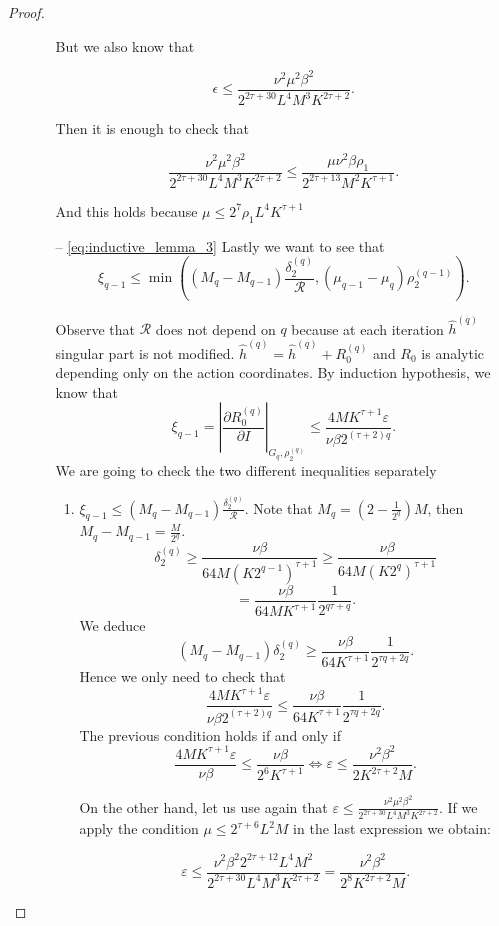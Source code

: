 \begin{proof}
\begin{enumerate}
\begin{itemize}
But we also know that

$$\epsilon \leq \frac{\nu^2 \mu^2 \beta^2}{2^{2\tau+30}L^4 M^3 K^{2\tau+2}}.$$

Then it is enough to check that

$$\frac{\nu^2 \mu^2 \beta^2}{2^{2\tau+30}L^4 M^3 K^{2\tau+2}}\leq \frac{\mu \nu^2 \beta \rho_1}{2^{2\tau+13} M^2 K^{\tau+1}}.$$

And this holds because $\mu \leq 2^7 \rho_1 L^4 K^{\tau+1}$

\item[--] \ref{eq:inductive_lemma_3} Lastly we want to see that
$$\xi_{q-1} \leq \min((M_q-M_{q-1})\frac{\delta_2^{(q)}}{\mathcal{R}},(\mu_{q-1}-\mu_{q})\rho_2^{(q-1)}).$$

Observe that $\mathcal{R}$ does not depend on $q$ because at each iteration $\hat{h}^{(q)}$ singular part is not modified. $\hat h^{(q)}= \hat h^{(q)} + R_0^{(q)}$ and $R_0$ is analytic depending only on the action coordinates.
By induction hypothesis, we know that
$$\xi_{q-1} = |\frac{\partial R_0^{(q)}}{\partial I}|_{G_q,\rho_2^{(q)}} \leq \frac{4MK^{\tau+1}\varepsilon}{\nu \beta 2^{(\tau+2)q}}.$$
We are going to check the \textcolor{black}{two} different inequalities separately
\begin{enumerate}
\item $\xi_{q-1} \leq (M_q-M_{q-1})\frac{\delta_2^{(q)}}{\mathcal{R}}$.
Note that $M_q =(2-\frac{1}{2^q})M$, then $M_q-M_{q-1} = \frac{M}{2^q}$.
$$\delta_2^{(q)} \geq \frac{\nu \beta}{64 M (K 2^{q-1})^{\tau+1}} \geq \frac{\nu\beta}{64 M (K 2^q)^{\tau+1}}$$
$$= \frac{\nu \beta}{64 M K^{\tau+1}}\frac{1}{2^{q\tau+q}}.$$
We deduce
$$(M_q-M_{q-1})\delta_2^{(q)} \geq \frac{\nu \beta}{64 K^{\tau+1}}\frac{1}{2^{\tau q + 2 q}}.$$
Hence we only need to check that
$$\frac{4MK^{\tau+1}\varepsilon}{\nu \beta 2^{(\tau+2)q}}\leq\frac{\nu \beta}{64 K^{\tau+1}}\frac{1}{2^{\tau q + 2 q}}.$$
The previous condition holds if and only if
$$\frac{4 M K^{\tau+1}\varepsilon}{\nu\beta} \leq \frac{\nu \beta}{2^6 K^{\tau+1}} \Leftrightarrow \varepsilon \leq \frac{\nu^2 \beta^2}{2 K^{2\tau+2}M}.$$

On the other hand, let us use again that $\varepsilon \leq \frac{\nu^2 \mu ^2 \beta^2}{2^{2\tau+30}L^4 M^3 K^{2\tau+2}}$. If we apply the condition $\mu \leq 2^{\tau+6}L^2 M$ in the last expression we obtain:

$$\varepsilon \leq \frac{\nu^2 \beta^2 2^{2\tau+12}L^4M^2}{2^{2\tau+30}L^4 M^3 K^{2\tau+2}} = \frac{\nu^2\beta^2}{2^8 K^{2\tau+2} M}.$$


\end{enumerate}
\end{itemize}
\end{enumerate}
\end{proof}
